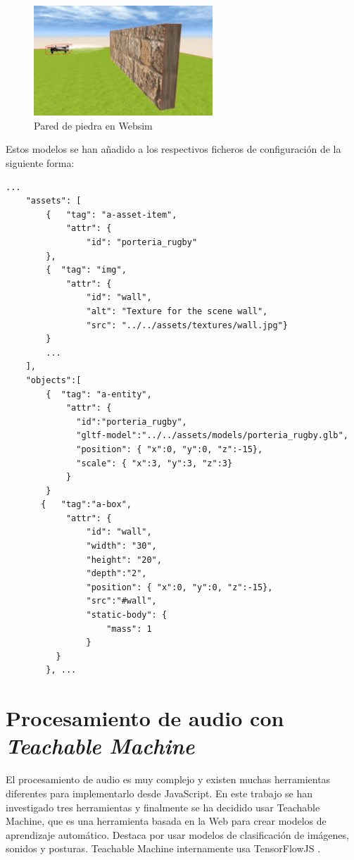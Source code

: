\begin{figure}[H]
\centering
    \includegraphics[width=0.6\textwidth, height=0.4\textwidth]{chapters/images/pared.png}
    \caption{Pared de piedra en Websim}
    \label{fig:f1}
  \end{figure}

Estos modelos se han añadido a los respectivos ficheros de configuración de la siguiente forma:
\begin{lstlisting}
...
    "assets": [
        {   "tag": "a-asset-item",
            "attr": {
                "id": "porteria_rugby"
		},
		{  "tag": "img",
            "attr": {
                "id": "wall",
                "alt": "Texture for the scene wall",
                "src": "../../assets/textures/wall.jpg"}
        }
		...
    ],
    "objects":[ 
        {  "tag": "a-entity",
            "attr": {
              "id":"porteria_rugby",
              "gltf-model":"../../assets/models/porteria_rugby.glb",
              "position": { "x":0, "y":0, "z":-15},
              "scale": { "x":3, "y":3, "z":3}
            }
        }
       {   "tag":"a-box",
            "attr": {
                "id": "wall",
                "width": "30",
                "height": "20",
                "depth":"2",
                "position": { "x":0, "y":0, "z":-15},
                "src":"#wall",
                "static-body": {
                    "mass": 1
                }
          }
        }, ...
\end{lstlisting}


\section{Procesamiento de audio con \textit{Teachable Machine}}

El procesamiento de audio es muy complejo y existen muchas herramientas diferentes para implementarlo desde JavaScript. En este trabajo se han investigado tres herramientas y finalmente se ha decidido usar Teachable Machine, que es una herramienta basada en la Web para crear modelos de aprendizaje automático. Destaca por usar modelos de clasificación de imágenes, sonidos y posturas. Teachable Machine internamente usa TensorFlowJS . 

